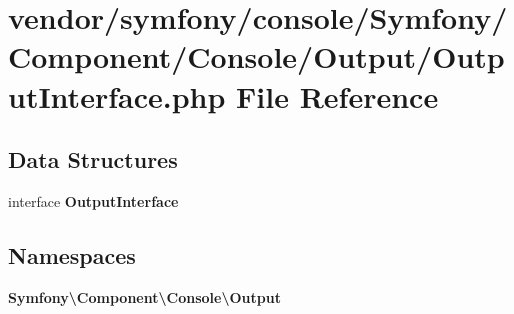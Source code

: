 \section{vendor/symfony/console/\+Symfony/\+Component/\+Console/\+Output/\+Output\+Interface.php File Reference}
\label{_output_interface_8php}
\subsection*{Data Structures}
\begin{DoxyCompactItemize}
\item 
interface {\bf Output\+Interface}
\end{DoxyCompactItemize}
\subsection*{Namespaces}
\begin{DoxyCompactItemize}
\item 
 {\bf Symfony\textbackslash{}\+Component\textbackslash{}\+Console\textbackslash{}\+Output}
\end{DoxyCompactItemize}
